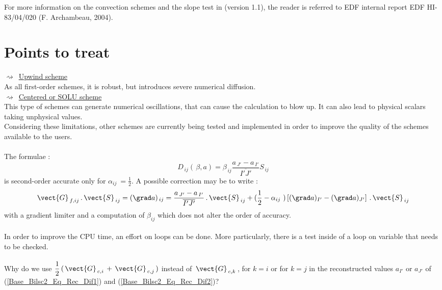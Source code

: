 \noindent{}
For more information on the convection schemes and the slope test in \CS
(version 1.1), the reader is referred to EDF internal report EDF HI-83/04/020 (F. Archambeau,
2004).

\newpage
\section*{Points to treat}
\hspace*{1cm}$\rightsquigarrow$\  \underline {Upwind scheme}\\
As all first-order schemes, it is robust, but introduces severe numerical diffusion. \\
\hspace*{1cm}$\rightsquigarrow$\ \underline {Centered or SOLU scheme}\\
This type of schemes can generate numerical oscillations, that can cause the calculation
to blow up. It can also lead to physical scalars taking unphysical values.\\
Considering these limitations, other schemes are currently being tested and implemented 
in order to improve the quality of the schemes  available to the users.\\\\
The formulae :
\begin{equation}
D_{\,ij}(\,\beta, a) = \beta_{\,ij} \frac{a_{\,J'}- a_{\,I'}}{\overline{I'J'}} S_{\,ij}
\end{equation}
is second-order accurate only for $\alpha_{ij}\ = \displaystyle\frac{1}{2}$.
A possible correction may be to write :\\
\begin{equation}
\vect{G}_{\,f,ij}\,.\,\vect{S}_{\,ij} = (\grad a)_{\,ij} = \frac{a_{\,J'}- a_{\,I'}}{\overline{I'J'}}\,.\,\vect{S}_{\,ij} + (\displaystyle\frac{1}{2} -
\alpha_{ij}\ )\left[(\grad a)_{I'} - (\grad a)_{J'}\right]\,.\,\vect{S}_{\,ij}
\end{equation}
with a gradient limiter and a computation of $\beta_{ij}$ which does not 
alter the order of accuracy.\\\\
In order to improve the CPU time, an effort on loops can be done. 
More particularly, there is a test  inside of a loop on variable  that needs 
to be checked.\\\\
Why do we use $\displaystyle\frac{1}{2}\,(\,\vect{G}_{\,c,i}\,+\,\vect{G}_{\,c,j}\,)$ instead of $\,\vect{G}_{\,c,k}\,$, for $k=i$ or for $k=j$ in the reconstructed values  $a_{I'}$ or $a_{J'}$ of (\ref{Base_Bilsc2_Eq_Rec_Dif1}) and (\ref{Base_Bilsc2_Eq_Rec_Dif2})?
